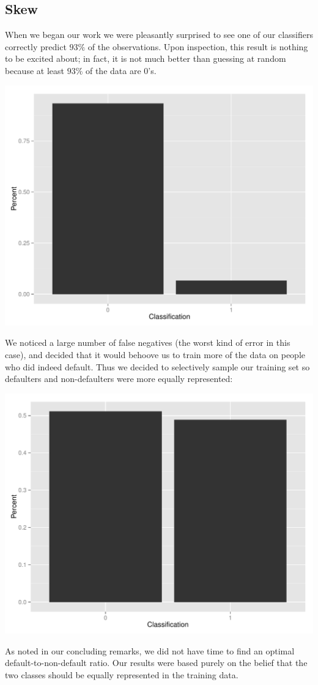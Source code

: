 \documentclass[11pt, oneside]{article}   	%
\begin{document}
	\subsection{Skew}
	When we began our work we were pleasantly surprised to see
	one of our classifiers correctly predict $93\%$ of the observations. Upon inspection,
	this result is nothing to be excited about; in fact, it is not much better than guessing at 
	random because at least $93\%$ of the data are $0$'s.
	\begin{center}
	\includegraphics[scale=0.5]{skew}
	\end{center}  
	We noticed a large number of false negatives (the worst kind of error in this case), and decided that it would behoove us to train more of the data on people who did indeed default. Thus we decided to selectively
	sample our training set so defaulters and non-defaulters were more equally represented:
	\begin{center}
	\includegraphics[scale=0.5]{less_skew}
	\end{center}
	As noted in our concluding remarks, we did not have time to find an optimal default-to-non-default
	ratio. Our results were based purely on the belief that the two classes should be equally
	represented in the training data.
	
\end{document}
